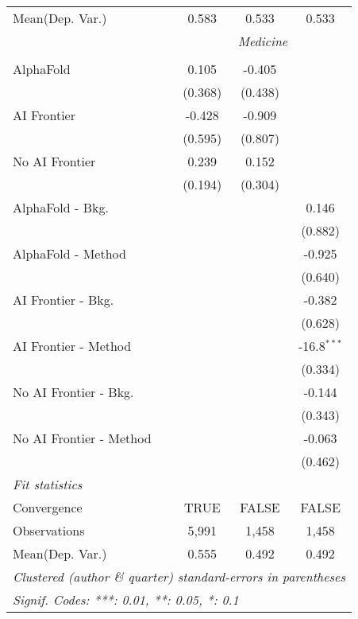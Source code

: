 \begin{tabular}{lccc}
Mean(Dep. Var.) & 0.583 & 0.533 & 0.533 \\
 & \multicolumn{3}{c}{\textit{Medicine}} \\ \\
   AlphaFold               & 0.105   & -0.405  &   \\   
                           & (0.368) & (0.438) &   \\   
   AI Frontier             & -0.428  & -0.909  &   \\   
                           & (0.595) & (0.807) &   \\   
   No AI Frontier          & 0.239   & 0.152   &   \\   
                           & (0.194) & (0.304) &   \\   
   AlphaFold - Bkg.        &         &         & 0.146\\   
                           &         &         & (0.882)\\   
   AlphaFold - Method      &         &         & -0.925\\   
                           &         &         & (0.640)\\   
   AI Frontier - Bkg.      &         &         & -0.382\\   
                           &         &         & (0.628)\\   
   AI Frontier - Method    &         &         & -16.8$^{***}$\\   
                           &         &         & (0.334)\\   
   No AI Frontier - Bkg.   &         &         & -0.144\\   
                           &         &         & (0.343)\\   
   No AI Frontier - Method &         &         & -0.063\\   
                           &         &         & (0.462)\\   
   \midrule
   \emph{Fit statistics}\\
   Convergence             &TRUE     & FALSE   & FALSE\\  
   Observations            & 5,991   & 1,458   & 1,458\\  
Mean(Dep. Var.) & 0.555 & 0.492 & 0.492 \\
   \midrule \midrule
   \multicolumn{4}{l}{\emph{Clustered (author \& quarter) standard-errors in parentheses}}\\
   \multicolumn{4}{l}{\emph{Signif. Codes: ***: 0.01, **: 0.05, *: 0.1}}\\
\end{tabular}
\par\endgroup
